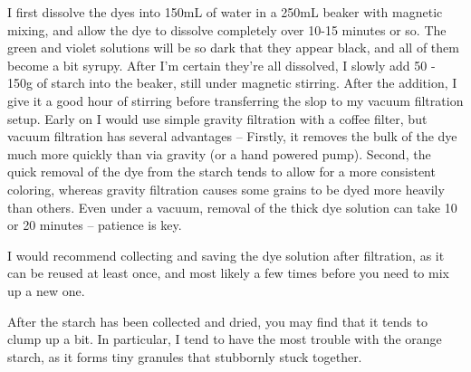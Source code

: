 \documentclass[11pt]{article}
\begin{document}
I first dissolve the dyes into 150mL of water in a 250mL beaker with magnetic mixing, and allow the dye to dissolve completely over 10-15 minutes or so. The green and violet solutions will be so dark that they appear black, and all of them become a bit syrupy. After I'm certain they're all dissolved, I slowly add 50 - 150g of starch into the beaker, still under magnetic stirring. After the addition, I give it a good hour of stirring before transferring the slop to my vacuum filtration setup. Early on I would use simple gravity filtration with a coffee filter, but vacuum filtration has several advantages -- Firstly, it removes the bulk of the dye much more quickly than via gravity (or a hand powered pump). Second, the quick removal of the dye from the starch tends to allow for a more consistent coloring, whereas gravity filtration causes some grains to be dyed more heavily than others. Even under a vacuum, removal of the thick dye solution can take 10 or 20 minutes -- patience is key.\newline

I would recommend collecting and saving the dye solution after filtration, as it can be reused at least once, and most likely a few times before you need to mix up a new one.\newline

After the starch has been collected and dried, you may find that it tends to clump up a bit. In particular, I tend to have the most trouble with the orange starch, as it forms tiny granules that stubbornly stuck together.\newline
\end{document}
